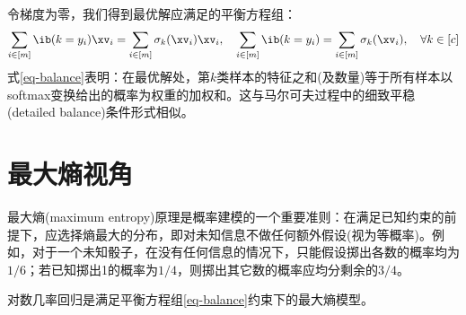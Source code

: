 \documentclass[a4paper,fleqn,fontset=none]{ctexart}
\begin{document}
令梯度为零，我们得到最优解应满足的平衡方程组：
\begin{align} \label{eq-balance}
    \sum_{i \in [m]} \ib(k = y_i) \xv_i = \sum_{i \in [m]} \sigma_k (\xv_i) \xv_i, \quad \sum_{i \in [m]} \ib(k = y_i) = \sum_{i \in [m]} \sigma_k (\xv_i), \quad \forall k \in [c]
\end{align}
式\eqref{eq-balance}表明：在最优解处，第$k$类样本的特征之和(及数量)等于所有样本以softmax变换给出的概率为权重的加权和。这与马尔可夫过程中的细致平稳(detailed balance)条件形式相似。

\section{最大熵视角}

最大熵(maximum entropy)原理是概率建模的一个重要准则：在满足已知约束的前提下，应选择熵最大的分布，即对未知信息不做任何额外假设(视为等概率)。例如，对于一个未知骰子，在没有任何信息的情况下，只能假设掷出各数的概率均为$1/6$；若已知掷出1的概率为$1/4$，则掷出其它数的概率应均分剩余的$3/4$。

\begin{theorem}
    对数几率回归是满足平衡方程组\eqref{eq-balance}约束下的最大熵模型。
\end{theorem}
\end{document}
